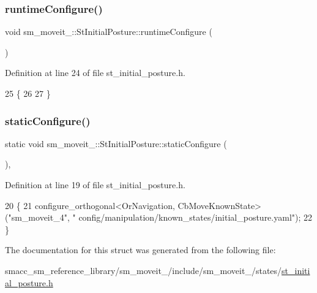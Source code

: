 \subsubsection{\texorpdfstring{runtime\+Configure()}{runtimeConfigure()}}
{\footnotesize\ttfamily void sm\+\_\+moveit\+\_\+::\+St\+Initial\+Posture\+::runtime\+Configure (\begin{DoxyParamCaption}{ }\end{DoxyParamCaption})\hspace{0.3cm}{\ttfamily [inline]}}



Definition at line 24 of file st\+\_\+initial\+\_\+posture.\+h.


\begin{DoxyCode}
25     \{
26         
27     \}
\end{DoxyCode}
\mbox{\label{structsm__moveit__4_1_1StInitialPosture_a64aa9970704ab8c38a22cae53a5750df}} 
\subsubsection{\texorpdfstring{static\+Configure()}{staticConfigure()}}
{\footnotesize\ttfamily static void sm\+\_\+moveit\+\_\+::\+St\+Initial\+Posture\+::static\+Configure (\begin{DoxyParamCaption}{ }\end{DoxyParamCaption})\hspace{0.3cm}{\ttfamily [inline]}, {\ttfamily [static]}}



Definition at line 19 of file st\+\_\+initial\+\_\+posture.\+h.


\begin{DoxyCode}
20     \{
21         configure\_orthogonal<OrNavigation, CbMoveKnownState>(\textcolor{stringliteral}{"sm\_moveit\_4"}, \textcolor{stringliteral}{"
      config/manipulation/known\_states/initial\_posture.yaml"});
22     \}
\end{DoxyCode}


The documentation for this struct was generated from the following file\+:\begin{DoxyCompactItemize}
\item 
smacc\+\_\+sm\+\_\+reference\+\_\+library/sm\+\_\+moveit\+\_/include/sm\+\_\+moveit\+\_/states/\hyperlink{4_2include_2sm__moveit__4_2states_2st__initial__posture_8h}{st\+\_\+initial\+\_\+posture.\+h}\end{DoxyCompactItemize}

